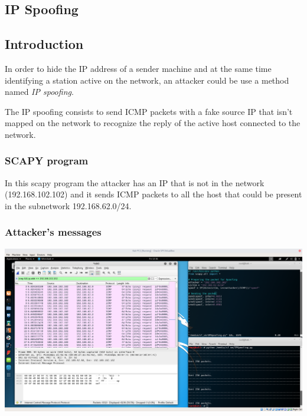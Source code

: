 \subsection{IP Spoofing}
\subsection{Introduction}
In order to hide the IP address of a sender machine and at the same time identifying a station active on the network, an attacker could be use a method named \textit{IP spoofing}.\par
The IP spoofing consists to send ICMP packets with a fake source IP that isn't mapped on the network to recognize the reply of the active host connected to the network.\par

\subsubsection{SCAPY program}
In this scapy program the attacker has an IP that is not in the network (192.168.102.102) and it sends ICMP packets to all the host that could be present in the subnetwork 192.168.62.0/24.\par


\subsubsection{Attacker's messages}
\includegraphics[width=16cm]{img/IPSpoofingICMP.png}

